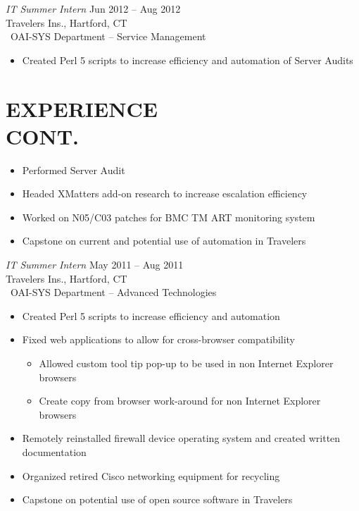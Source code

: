 \documentclass[margin]{res}
\begin{document}
\begin{resume}
   {\sl IT Summer Intern} \hfill Jun 2012 -- Aug 2012 \\
   Travelers Ins., Hartford, CT\\\
   OAI-SYS Department -- Service Management
   \begin{itemize} %
      \item Created Perl 5 scripts to increase efficiency and
         automation of Server Audits
   \end{itemize}
   \section{EXPERIENCE \\ CONT.}
   \begin{itemize}
      \item Performed Server Audit
      \item Headed XMatters add-on research to increase escalation
         efficiency
      \item Worked on N05/C03 patches for BMC TM ART monitoring
         system
      \item Capstone on current and potential use of
         automation in Travelers
   \end{itemize}
   
   {\sl IT Summer Intern} \hfill  May 2011 -- Aug 2011 \\
   Travelers Ins., Hartford, CT\\\
   OAI-SYS Department -- Advanced Technologies
   \begin{itemize}   %
      \item Created Perl 5 scripts to increase efficiency and
         automation
      \item Fixed web applications to allow for cross-browser
         compatibility
         \begin{itemize} %
            \item Allowed custom tool tip pop-up to be used in non
               Internet Explorer \\
               browsers
            \item Create copy from browser work-around for non
               Internet Explorer \\
               browsers
         \end{itemize}
      \item Remotely reinstalled firewall device operating
         system and created written \\
         documentation
      \item Organized retired Cisco networking equipment for
         recycling
      \item Capstone on potential use of open source software
         in Travelers
   \end{itemize}

\end{resume}
\end{document}
